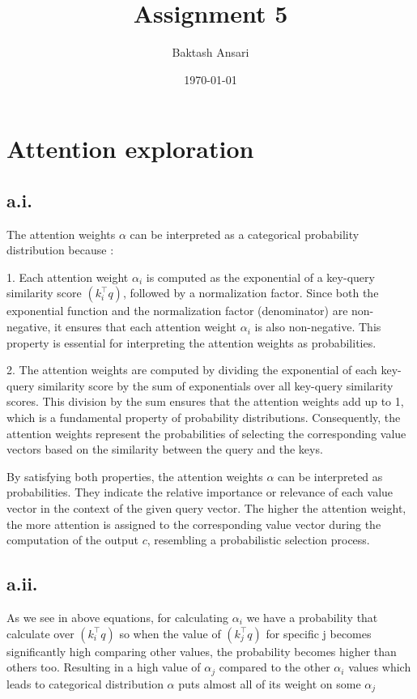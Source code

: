 \documentclass[a4paper]{article}
\title{Assignment 5}
\author{Baktash Ansari}
\date{\today}
\begin{document}
  

\maketitle

\section{Attention exploration}

\subsection*{a.i.}
The attention weights \(\alpha\) can be interpreted as a categorical probability distribution because :

1. Each attention weight $\alpha_i$ is computed as the exponential of a key-query similarity score $(k_i^\top q)$, followed by a normalization factor. Since both the exponential function and the normalization factor (denominator) are non-negative, it ensures that each attention weight $\alpha_i$ is also non-negative. This property is essential for interpreting the attention weights as probabilities.

2. The attention weights are computed by dividing the exponential of each key-query similarity score by the sum of exponentials over all key-query similarity scores. This division by the sum ensures that the attention weights add up to 1, which is a fundamental property of probability distributions. Consequently, the attention weights represent the probabilities of selecting the corresponding value vectors based on the similarity between the query and the keys.

By satisfying both properties, the attention weights $\alpha$ can be interpreted as probabilities. They indicate the relative importance or relevance of each value vector in the context of the given query vector. The higher the attention weight, the more attention is assigned to the corresponding value vector during the computation of the output $c$, resembling a probabilistic selection process.

\subsection*{a.ii.}

As we see in above equations, for calculating $\alpha_i$ we have a probability that calculate over $(k_i^\top q)$ so when the value of $(k_j^\top q)$ for specific j becomes significantly high comparing other values, the probability becomes higher than others too.
Resulting in  a high value of $\alpha_j$ compared to the other $\alpha_i$ values which leads to categorical distribution $\alpha$ puts almost all of its weight on some $\alpha_j$
\end{document}
